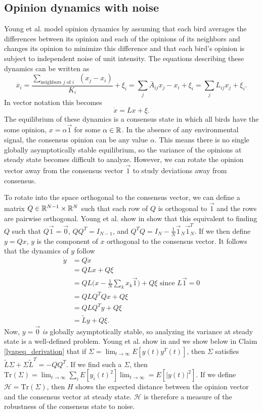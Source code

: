 \documentclass{article}
\newcommand{\Tr}{\text{Tr}}
\begin{document}
\subsection{Opinion dynamics with noise }
Young et al. \cite{Young:2010fk} model opinion dynamics by assuming that each bird averages the differences between its opinion and each of the opinions of its neighbors and changes its opinion to minimize this difference and that each bird's opinion is subject to independent noise of unit intensity. The equations describing these dynamics can be written as 
\begin{equation}
\dot{x_i}=\frac{\sum_{\text{neighbors $j$ of $i$ } }(x_j-x_i)}{K_i} +\xi_i=\sum_j\bar{A}_{ij}x_j-x_i+\xi_i=\sum_jL_{ij}x_j+\xi_i.
\end{equation}
In vector notation this becomes
\begin{equation}
\dot{x}=Lx+\xi.
\end{equation}
The equilibrium of these dynamics is a consensus state in which all birds have the some opinion, $x=\alpha\vec{1}$ for some $\alpha\in{\mathbb{R}}$. In the absence of any environmental signal, the consensus opinion can be any value $\alpha$. This means there is no single globally asymptotically stable equilibrium, so the variance of the opinions at steady state becomes difficult to analyze. However, we can rotate the opinion vector away from the consensus vector $\vec{1}$ to study deviations away from consensus. 

To rotate into the space orthogonal to the consensus vector, we can define a matrix $Q\in{\mathbb{R}}^{N-1}\times{\mathbb{R}}^N$ such that each row of $Q$ is orthogonal to $\vec{1}$ and the rows are pairwise orthogonal. Young et al. show in \cite{Young:2010fk} show that this equivalent to finding $Q$ such that $Q\vec{1}=\vec{0}$, $QQ^T=I_{N-1}$, and $Q^TQ=I_N-\frac{1}{N}\vec{1}_N\vec{1}_N^T$. If we then define $y=Qx$, $y$ is the component of $x$ orthogonal to the consensus vector. It follows that the dynamics of $y$ follow
\begin{align*}
\dot{y}&=Q\dot{x}
\\&=QLx+Q\xi
\\&=QL\big(x-\frac{1}{N}\sum_kx_k\vec{1}\big)+Q\xi \text{ since } L\vec{1}=0
\\&=QLQ^TQx+Q\xi
\\&=QLQ^Ty+Q\xi
\\&=\tilde{L}y+Q\xi.
\end{align*}
Now, $y=\vec{0}$ \emph{is} globally asymptotically stable, so analyzing its variance at steady state is a well-defined problem. Young et al. show in \cite{Young:2010fk} and we show below in Claim \ref{lyapeq_derivation} that if $\Sigma=\lim_{t\to\infty}E[y(t)y^T(t)]$, then $\Sigma$ satisfies $\tilde{L}\Sigma+\Sigma \tilde{L}^T=-QQ^T$. If we find such a $\Sigma$, then $\Tr(\Sigma)=\lim_{t\to\infty}\sum_iE[y_i(t)^2]\lim_{t\to\infty}=E[|y(t)|^2].$ If we define $\mathscr{H}=\Tr(\Sigma)$, then $H$ shows the expected distance between the opinion vector and the consensus vector at steady state. $\mathscr{H}$ is therefore a measure of the robustness of the consensus state to noise.
\end{document}
